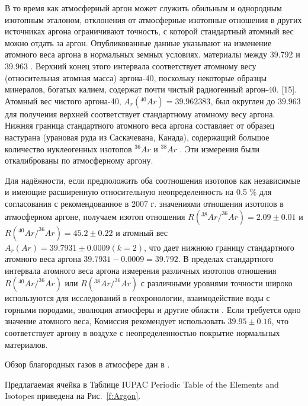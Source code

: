 \documentclass[a5paper,openany]{book}
\begin{document}
В то время как атмосферный аргон может служить обильным и однородным изотопным эталоном, отклонения от
атмосферные изотопные отношения в других источниках аргона ограничивают точность, с которой стандартный атомный вес
можно отдать за аргон. Опубликованные данные указывают на изменение атомного веса аргона в нормальных земных условиях.
материалы между 39.792 и 39.963 \cite{IUPACArgon}. Верхний конец этого интервала соответствует атомному весу
(относительная атомная масса) аргона-40, поскольку некоторые образцы минералов, богатых калием, содержат почти чистый радиогенный аргон-40.
[15]. Атомный вес чистого аргона-40, $A_r(^{40}Ar) = 39.962 383$, был округлен до $39.963$ для получения верхней
соответствует стандартному атомному весу аргона. Нижняя граница стандартного атомного веса аргона составляет от
образец настурана (урановая руда из Саскачевана, Канада), содержащий большое количество нуклеогенных изотопов 
$^{36}Ar$ и $^{38}Ar$ \cite{Argon1993}. Эти измерения были откалиброваны по атмосферному аргону.

Для надёжности, если предположить
оба соотношения изотопов как независимые и имеющие расширенную относительную неопределенность на 0.5 \% для согласования с  рекомендованное в 2007 г. значениями отношения изотопов в атмосферном аргоне, получаем изотоп
отношения $R(^{38}Ar/^{36}Ar) = 2.09 \pm 0.01$ и $R(^{40}Ar/^{36}Ar) = 45.2 \pm 0.22$ и атомный вес
$A_r(Ar) = 39.7931 \pm 0.0009 (k = 2)$, что дает нижнюю границу стандартного атомного веса аргона $39.7931 - 0.0009 = 39.792$. В пределах стандартного интервала атомного веса аргона измерения различных изотопов
отношения $R(^{40}Ar/^{36}Ar)$ или $R(^{38}Ar/^{36}Ar)$ с различными уровнями точности широко используются для исследований в геохронологии,
взаимодействие воды с горными породами, эволюция атмосферы и другие области \cite{IUPACArgon}. Если требуется одно значение атомного веса,
Комиссия рекомендует использовать $39.95\pm 0.16$, что соответствует аргону в воздухе с неопределенностью покрытие нормальных материалов.

Обзор благородных газов в атмосфере дан в  \cite{NobleGasesTracers}.


Предлагаемая ячейка в Таблице IUPAC Periodic Table of the Elements and Isotopes \cite{IPTEI} приведена на Рис.~\ref{f:Argon}.
\end{document}
